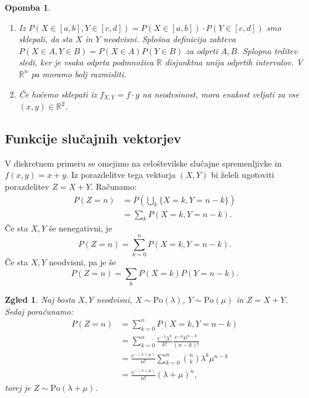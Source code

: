 \documentclass[10pt, a4paper]{article}
\newtheorem*{opomba}{Opomba}
\newtheorem{zgled}[izr]{Zgled}
\newcommand{\R}{\mathbb {R}}
\begin{document}
\begin{opomba}
  \begin{enumerate}
    \item Iz $P(X \in [a, b], Y \in [c, d]) = P(X \in [a, b]) \cdot P(Y \in [c, d])$
    smo sklepali, da sta $X$ in $Y$ neodvisni. Splošna definicija zahteva $P(X \in A, Y \in B) = P(X \in A) P(Y \in B)$
    za odprti $A, B$. Splopna trditev sledi, ker je vsaka odprta podmnožica $\R$ disjunktna unija odprtih intervalov.
    V $\R^n$ pa moramo bolj razmisliti.
    \item Če hočemo sklepati iz $f_{X, Y} = f \cdot g$ na neodvsinost, mora enakost veljati za vse $(x, y) \in \R^2$.
  \end{enumerate}
\end{opomba}

\subsection{Funkcije slučajnih vektorjev}

V diskretnem primeru se omejimo na celoštevilske slučajne spremenljivke in $f(x, y) = x + y$.
Iz porazdelitve tega vektorja $(X, Y)$ bi želeli ugotoviti porazdelitev $Z = X + Y$.
Računamo:
\begin{align*}
  P(Z = n) &= P\left(\bigcup_k \{X = k, Y = n - k\}\right)\\
  &= \sum_k P(X = k, Y = n - k).
\end{align*}
Če sta $X, Y$ še nenegativni, je
$$P(Z = n) = \sum_{k = 0} ^n P(X = k, Y = n - k).$$
Če sta $X, Y$ neodvisni, pa je še 
$$P(Z = n) = \sum_{k} P(X = k) P(Y = n - k).$$

\begin{zgled}
  Naj bosta $X, Y$ neodvisni, $X \sim \mathrm{Po} (\lambda)$, $Y \sim \mathrm{Po} (\mu)$ in $Z = X + Y$.
  Sedaj poračunamo:
  \begin{align*}
    P(Z = n) &= \sum_{k = 0} ^n P(X = k, Y = n - k)\\
    &= \sum_{k = 0} ^n \frac{e^{-\lambda} \lambda^k}{k!} \frac{e^{-\mu} \mu^{n - k}}{(n - k)!}\\
    &= \frac{e^{-(\lambda + \mu)}}{n!} \sum_{k = 0} ^n \binom{n}{k} \lambda^k \mu^{n - k}\\
    &= \frac{e^{-(\lambda + \mu)}}{n!} (\lambda + \mu)^n,
  \end{align*}
  torej je $Z \sim \mathrm{Po} (\lambda + \mu)$.
\end{zgled}
\end{document}
